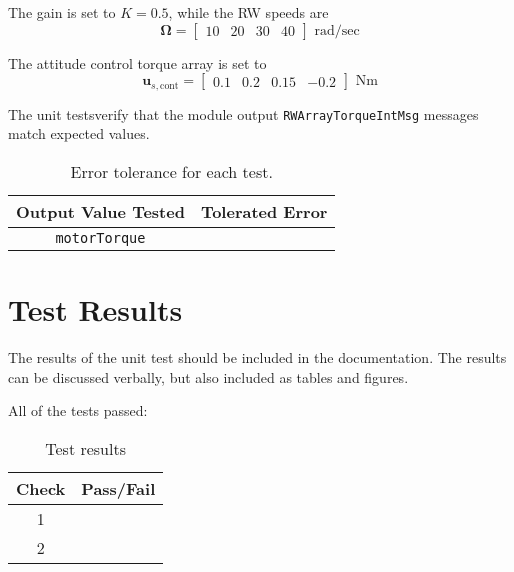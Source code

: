 The gain is set to $K = 0.5$, while the RW speeds are
\begin{equation}
	\bm\Omega = \begin{bmatrix}
		10 & 20 & 30 & 40
	\end{bmatrix} \text{ rad/sec}
\end{equation}

The attitude control torque array is set to 
\begin{equation}
	\bm u_{s,\text{cont}} = \begin{bmatrix}
		0.1 & 0.2 & 0.15 & -0.2
	\end{bmatrix} \text{ Nm}
\end{equation}



The unit testsverify that the module output {\tt RWArrayTorqueIntMsg} messages match expected values.
\begin{table}[htbp]
	\caption{Error tolerance for each test.}
	\label{tab:errortol}
	\centering \fontsize{10}{10}\selectfont
	\begin{tabular}{ c | c } %
		\hline\hline
		\textbf{Output Value Tested}  & \textbf{Tolerated Error}  \\ 
		\hline
		{\tt motorTorque}        & 	   \\ 
		\hline\hline
	\end{tabular}
\end{table}




\section{Test Results}
The results of the unit test should be included in the documentation.  The results can be discussed verbally, but also included as tables and figures.  

All of the tests passed:
\begin{table}[H]
	\caption{Test results}
	\label{tab:results}
	\centering \fontsize{10}{10}\selectfont
	\begin{tabular}{c | c  } %
		\hline\hline
		\textbf{Check} 						  		&\textbf{Pass/Fail} \\ 
		\hline
	   1	   			&  \\ 
	   2	   			&   \\ 
	   \hline\hline
	\end{tabular}
\end{table}





